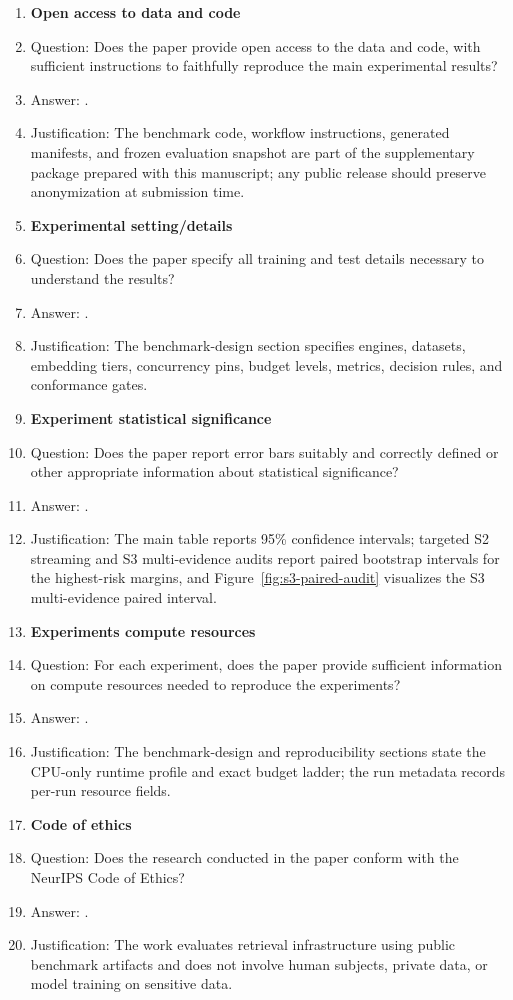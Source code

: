 \begin{enumerate}
\item {\bf Open access to data and code}
    \item[] Question: Does the paper provide open access to the data and code, with sufficient instructions to faithfully reproduce the main experimental results?
    \item[] Answer: \answerYes{}.
    \item[] Justification: The benchmark code, workflow instructions, generated manifests, and frozen evaluation snapshot are part of the supplementary package prepared with this manuscript; any public release should preserve anonymization at submission time.

\item {\bf Experimental setting/details}
    \item[] Question: Does the paper specify all training and test details necessary to understand the results?
    \item[] Answer: \answerYes{}.
    \item[] Justification: The benchmark-design section specifies engines, datasets, embedding tiers, concurrency pins, budget levels, metrics, decision rules, and conformance gates.

\item {\bf Experiment statistical significance}
    \item[] Question: Does the paper report error bars suitably and correctly defined or other appropriate information about statistical significance?
    \item[] Answer: \answerYes{}.
    \item[] Justification: The main table reports 95\% confidence intervals; targeted S2 streaming and S3 multi-evidence audits report paired bootstrap intervals for the highest-risk margins, and Figure~\ref{fig:s3-paired-audit} visualizes the S3 multi-evidence paired interval.

\item {\bf Experiments compute resources}
    \item[] Question: For each experiment, does the paper provide sufficient information on compute resources needed to reproduce the experiments?
    \item[] Answer: \answerYes{}.
    \item[] Justification: The benchmark-design and reproducibility sections state the CPU-only runtime profile and exact budget ladder; the run metadata records per-run resource fields.

\item {\bf Code of ethics}
    \item[] Question: Does the research conducted in the paper conform with the NeurIPS Code of Ethics?
    \item[] Answer: \answerYes{}.
    \item[] Justification: The work evaluates retrieval infrastructure using public benchmark artifacts and does not involve human subjects, private data, or model training on sensitive data.


\end{enumerate}
